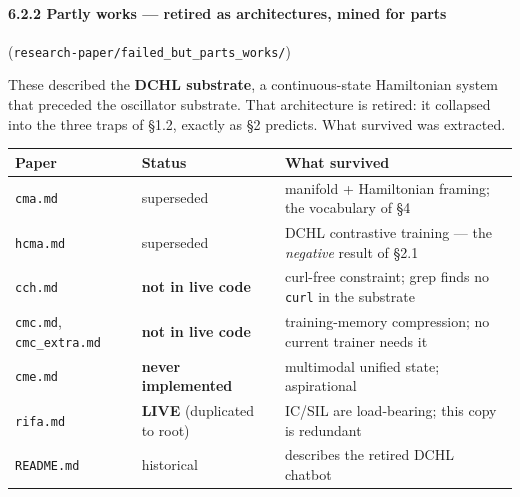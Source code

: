 \documentclass[
  11pt,
  a4paper,
]{article}
\begin{document}
\paragraph{6.2.2 Partly works --- retired as architectures, mined for
parts}\label{partly-works-retired-as-architectures-mined-for-parts}

(\texttt{research-paper/failed\_but\_parts\_works/})

These described the \textbf{DCHL substrate}, a continuous-state
Hamiltonian system that preceded the oscillator substrate. That
architecture is retired: it collapsed into the three traps of §1.2,
exactly as §2 predicts. What survived was extracted.

\begin{longtable}[]{@{}
  >{\raggedright\arraybackslash}p{}
  >{\raggedright\arraybackslash}p{}
  >{\raggedright\arraybackslash}p{}@{}}
\toprule\noalign{}
\begin{minipage}[b]{\linewidth}\raggedright
Paper
\end{minipage} & \begin{minipage}[b]{\linewidth}\raggedright
Status
\end{minipage} & \begin{minipage}[b]{\linewidth}\raggedright
What survived
\end{minipage} \\
\midrule\noalign{}
\endhead
\bottomrule\noalign{}
\endlastfoot
\texttt{cma.md} & superseded & manifold + Hamiltonian framing; the
vocabulary of §4 \\
\texttt{hcma.md} & superseded & DCHL contrastive training --- the
\emph{negative} result of §2.1 \\
\texttt{cch.md} & \textbf{not in live code} & curl-free constraint; grep
finds no \texttt{curl} in the substrate \\
\texttt{cmc.md}, \texttt{cmc\_extra.md} & \textbf{not in live code} &
training-memory compression; no current trainer needs it \\
\texttt{cme.md} & \textbf{never implemented} & multimodal unified state;
aspirational \\
\texttt{rifa.md} & \textbf{LIVE} (duplicated to root) & IC/SIL are
load-bearing; this copy is redundant \\
\texttt{README.md} & historical & describes the retired DCHL chatbot \\
\end{longtable}
\end{document}
